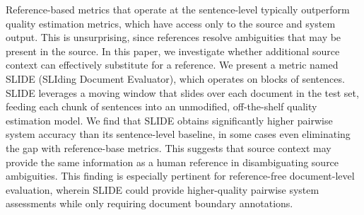 Reference-based metrics that operate at the sentence-level typically outperform quality estimation metrics, which have access only to the source and system output. This is unsurprising, since references resolve ambiguities that may be present in the source. In this paper, we investigate whether additional source context can effectively substitute for a reference. We present a metric named SLIDE (SLIding Document Evaluator), which operates on blocks of sentences. SLIDE leverages a moving window that slides over each document in the test set, feeding each chunk of sentences into an unmodified, off-the-shelf quality estimation model. We find that SLIDE obtains significantly higher pairwise system accuracy than its sentence-level baseline, in some cases even eliminating the gap with reference-base metrics. This suggests that source context may provide the same information as a human reference in disambiguating source ambiguities. This finding is especially pertinent for reference-free document-level evaluation, wherein SLIDE could provide higher-quality pairwise system assessments while only requiring document boundary annotations.